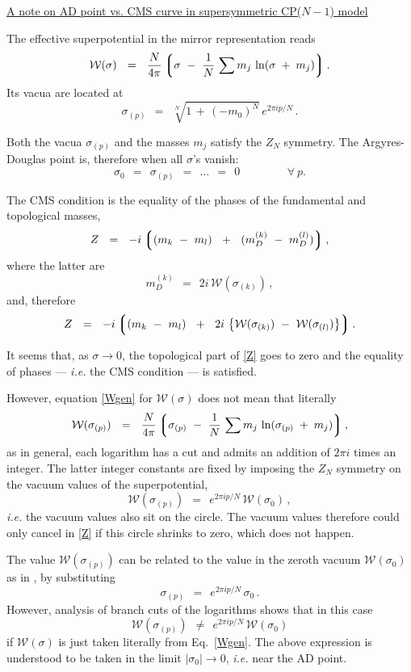 \documentclass[12pt]{article}
\def\beq{\begin{equation}}
\def\eeq{\end{equation}}
\newcommand{\mc}[1]{\mathcal{#1}}
\newcommand{\lgr}{\left\lgroup}
\newcommand{\rgr}{\right\rgroup}
\begin{document}
{\centering
\large\underline{A note on AD point vs. CMS curve in supersymmetric CP($N-1$) model}}

\vspace{1.5cm}
The effective superpotential in the mirror representation reads \cite{Olmez:2007sg,Dorey:1998yh}
\beq
\label{Wgen}
	\mc{W}(\sigma) ~~=~~ \frac{N}{4\pi}  
		\lgr  \sigma ~-~ \frac{1}{N}\, \sum m_j\, \ln ( \sigma \;+\; m_j ) \rgr .
\eeq
Its vacua are located at
\beq
\label{sigmap}
	\sigma_{(p)} ~~=~~ \sqrt[N]{ 1 \,+\,  (- m_0)^N }\, e^{2\pi i p / N}\,.
\eeq

Both the vacua $ \sigma_{(p)} $ and the masses $ m_j $ satisfy the $ Z_N $ symmetry. 
The Argyres-Douglas point is, therefore when all $ \sigma $'s vanish:
\beq
	\sigma_0  ~~=~~ \sigma_{(p)} ~~=~~ \dots ~~=~~ 0\, \qquad\qquad \forall~ p.
\eeq

The CMS condition is the equality of the phases of the fundamental and topological masses,
\beq
	Z  ~~=~~ -i \lgr   (m_k ~-~ m_l )  ~~+~~ (m_D^{(k)} ~-~ m_D^{(l)}) \rgr,
\eeq
where the latter are
\beq
	m_D^{(k)} ~~=~~ 2i\, \mc{W}(\sigma_{(k)})\,,
\eeq
and, therefore
\beq
\label{Z}
	Z  ~~=~~ -i \lgr (m_k ~-~ m_l )  ~~+~~ 2i\, \left\{ \mc{W}(\sigma_{(k)}) ~-~ \mc{W}(\sigma_{(l)}) \right\} \rgr.
\eeq

It seems that, as $ \sigma \to 0 $, the topological part of \eqref{Z} goes to zero and the equality of
phases --- {\it i.e.} the CMS condition --- is satisfied.

However, equation \eqref{Wgen} for $\mc{W}(\sigma)$ does not mean that literally
\[
	\mc{W}(\sigma_{(p)}) ~~=~~ \frac{N}{4\pi}  
		\lgr  \sigma_{(p)} ~-~ \frac{1}{N}\, \sum m_j\, \ln ( \sigma_{(p)} \;+\; m_j ) \rgr ,
\]
as in general, each logarithm has a cut and admits an addition of $ 2\pi i $ times an integer. 
The latter integer constants are fixed by imposing the $ Z_N $ symmetry on the vacuum values of the superpotential,
\beq
\label{WZN}
	\mc{W}(\sigma_{(p)}) ~~=~~ e^{2\pi i p/N}\, \mc{W}(\sigma_0) \,,
\eeq
{\it i.e.} the vacuum values also sit on the circle. 
The vacuum values therefore could only cancel in \eqref{Z} if this circle shrinks to zero, which does not
happen. 

The value $ \mc{W}(\sigma_{(p)}) $ can be related to the value in the zeroth vacuum 
$ \mc{W}(\sigma_0) $ as in \cite{Olmez:2007sg}, by substituting 
\[
	\sigma_{(p)} ~~=~~ e^{2\pi i p/N}\, \sigma_0\,.
\]
However, analysis of branch cuts of the logarithms shows that in this case
\[
	\mc{W}(\sigma_{(p)})  ~~\neq~~   e^{2\pi i p/N}\, \mc{W}(\sigma_0)
\]
if $ \mc{W}(\sigma) $ is just taken literally from Eq.~\eqref{Wgen}. The above expression is understood
to be taken in the limit $ |\sigma_0| \to 0 $, {\it i.e.} near the AD point.
\end{document}
